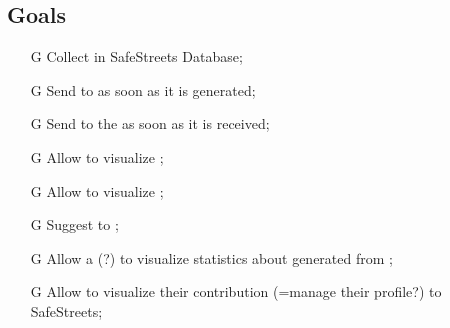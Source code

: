 \documentclass[../../rasd.tex]{subfiles}
\begin{document}
\subsection{Goals}
\begin{itemize}
	\item[G\subs{1}]Collect  in SafeStreets Database;
	\item[G\subs{2}]Send  to  as soon as it is generated;
	\item[G\subs{3}]Send  to the  as soon as it is received;
	\item[G\subs{4}]Allow  to visualize ;
	\item[G\subs{5}]Allow  to visualize ;
	\item[G\subs{6}]Suggest  to ;
	\item[G\subs{7}]Allow a  (?) to visualize statistics about  generated from ;
	\item[G\subs{8}]Allow  to visualize their contribution (=manage their profile?) to SafeStreets;
\end{itemize}
\end{document}

